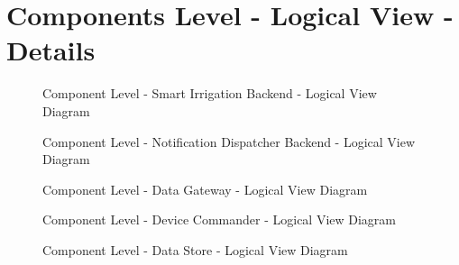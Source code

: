 \chapter{Components Level - Logical View - Details}
\label{AppendixC}

\begin{figure}[H]
   \centering
   \resizebox{0.75\columnwidth}{!}
   {
      
   }
   \caption[Component Level - Smart Irrigation Backend - Logical View Diagram]{Component Level - Smart Irrigation Backend - Logical View Diagram}
   \label{fig:AppendixC:irrig}
\end{figure}

\begin{figure}[H]
   \centering
   \resizebox{0.75\columnwidth}{!}
   {
      
   }
   \caption[Component Level - Notification Dispatcher Backend - Logical View Diagram]{Component Level - Notification Dispatcher Backend - Logical View Diagram}
   \label{fig:AppendixC:notidispatcher}
\end{figure}

\begin{figure}[H]
   \centering
   \resizebox{\columnwidth}{!}
   {
      
   }
   \caption[Component Level - Data Gateway - Logical View Diagram]{Component Level - Data Gateway - Logical View Diagram}
   \label{fig:AppendixC:gateway}
\end{figure}

\begin{figure}[H]
   \centering
   \resizebox{0.75\columnwidth}{!}
   {
      
   }
   \caption[Component Level - Device Commander - Logical View Diagram]{Component Level - Device Commander - Logical View Diagram}
   \label{fig:AppendixC:commander}
\end{figure}

\begin{figure}[H]
   \centering
   \resizebox{\columnwidth}{!}
   {
      
   }
   \caption[Component Level - Data Store - Logical View Diagram]{Component Level - Data Store - Logical View Diagram}
   \label{fig:AppendixC:store}
\end{figure}
